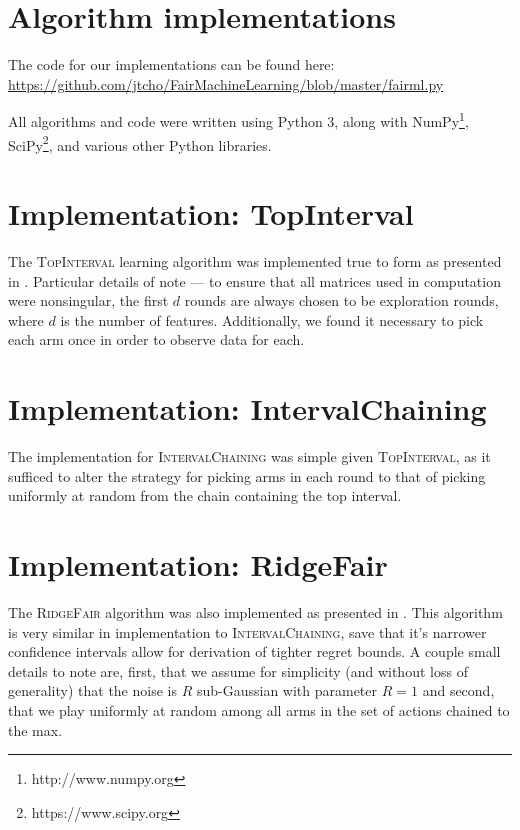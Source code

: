 \documentclass[11pt]{article}
\begin{document}
\section{Algorithm implementations}

The code for our implementations can be found here: \url{https://github.com/jtcho/FairMachineLearning/blob/master/fairml.py}

All algorithms and code were written using Python 3, along with NumPy\footnote{http://www.numpy.org}, SciPy\footnote{https://www.scipy.org}, and various other Python libraries.

\section{Implementation: TopInterval}

The \textsc{TopInterval} learning algorithm was implemented true to form as presented in . Particular details of note --- to ensure that all matrices used in computation were nonsingular, the first $d$ rounds are always chosen to be exploration rounds, where $d$ is the number of features. Additionally, we found it necessary to pick each arm once in order to observe data for each.

\section{Implementation: IntervalChaining}

The implementation for \textsc{IntervalChaining} was simple given \textsc{TopInterval}, as it sufficed to alter the strategy for picking arms in each round to that of picking uniformly at random from the chain containing the top interval.

\section{Implementation: RidgeFair}

The \textsc{RidgeFair} algorithm was also implemented as presented in . This algorithm is very similar in implementation to \textsc{IntervalChaining}, save that it’s narrower confidence intervals allow for derivation of tighter regret bounds. A couple small details to note are, first, that we assume for simplicity (and without loss of generality) that the noise is $R$ sub-Gaussian with parameter $R = 1$ and second, that we play uniformly at random among all arms in the set of actions chained to the max.
\end{document}
